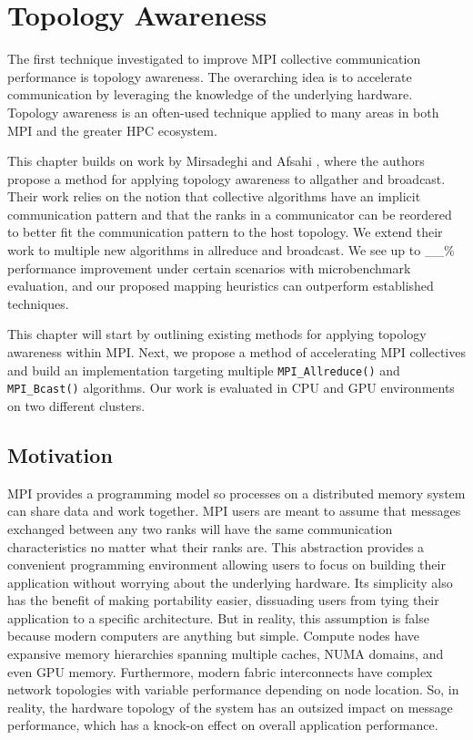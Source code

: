 
\glsresetall %
\chapter[Topology]{Topology Awareness}\label{ch:TopologyAwareness}

The first technique investigated to improve MPI collective communication performance is topology awareness.
The overarching idea is to accelerate communication by leveraging the knowledge of the underlying hardware.
Topology awareness is an often-used technique applied to many areas in both MPI and the greater HPC ecosystem.

This chapter builds on work by Mirsadeghi and Afsahi \cite{Mirsadeghi2016TopoAwareCollRR}, where the authors propose a method for applying topology awareness to allgather and broadcast.
Their work relies on the notion that collective algorithms have an implicit communication pattern and that the ranks in a communicator can be reordered to better fit the communication pattern to the host topology.
We extend their work to multiple new algorithms in allreduce and broadcast.
We see up to \_\_\% performance improvement under certain scenarios with microbenchmark evaluation, and our proposed mapping heuristics can outperform established techniques.

This chapter will start by outlining existing methods for applying topology awareness within MPI.
Next, we propose a method of accelerating MPI collectives and build an implementation targeting multiple \texttt{MPI\_Allreduce()} and \texttt{MPI\_Bcast()} algorithms.
Our work is evaluated in CPU and GPU environments on two different clusters.

\section{Motivation}
MPI provides a programming model so processes on a distributed memory system can share data and work together.
MPI users are meant to assume that messages exchanged between any two ranks will have the same communication characteristics no matter what their ranks are. 
This abstraction provides a convenient programming environment allowing users to focus on building their application without worrying about the underlying hardware. 
Its simplicity also has the benefit of making portability easier, dissuading users from tying their application to a specific architecture.
But in reality, this assumption is false because modern computers are anything but simple. 
Compute nodes have expansive memory hierarchies spanning multiple caches, NUMA domains, and even GPU memory.
Furthermore, modern fabric interconnects have complex network topologies with variable performance depending on node location.
So, in reality, the hardware topology of the system has an outsized impact on message performance, which has a knock-on effect on overall application performance. 

